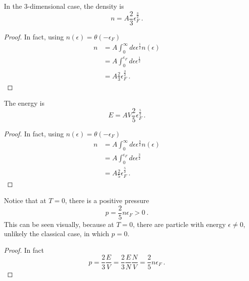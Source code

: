     In the $3$-dimensional case, the density is
    \begin{equation*}
        n = A \frac{2}{3} \epsilon_F^{\frac{3}{2}} ~.
    \end{equation*}
    \begin{proof}
        In fact, using $n (\epsilon) = \theta (- \epsilon_F)$
        \begin{equation*}
        \begin{aligned}
            n & = A \int_0^\infty d\epsilon \epsilon^{\frac{1}{2}} n(\epsilon) \\ & = A \int_0^{\epsilon_F} d\epsilon \epsilon^{\frac{1}{2}} \\ & = A \frac{2}{3} \epsilon_F^{\frac{3}{2}} ~.
        \end{aligned}
        \end{equation*}
    \end{proof}
    The energy is 
    \begin{equation*}
        E = A V \frac{2}{5} \epsilon_F^{\frac{5}{2}} ~.
    \end{equation*}
    \begin{proof}
        In fact, using $n (\epsilon) = \theta (- \epsilon_F)$
        \begin{equation*}
        \begin{aligned}
            n & = A \int_0^\infty d\epsilon \epsilon^{\frac{3}{2}} n(\epsilon) \\ & = A \int_0^{\epsilon_F} d\epsilon \epsilon^{\frac{3}{2}} \\ & = A \frac{2}{5} \epsilon_F^{\frac{5}{2}} ~.
        \end{aligned}
        \end{equation*}
    \end{proof}

    Notice that at $T = 0$, there is a positive pressure 
    \begin{equation*}
        p = \frac{2}{5} n \epsilon_F > 0~.
    \end{equation*}
    This can be seen visually, because at $T=0$, there are particle with energy $\epsilon \neq 0$, unlikely the classical case, in which $p = 0$.
    \begin{proof}
        In fact 
        \begin{equation*}
            p = \frac{2}{3} \frac{E}{V} = \frac{2}{3} \frac{E}{N} \frac{N}{V} = \frac{2}{5} n \epsilon_F ~. 
        \end{equation*}
    \end{proof}

